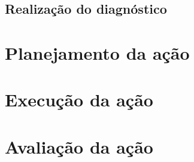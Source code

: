	\subsection{Realização do diagnóstico}



\section{Planejamento da ação}
\section{Execução da ação}
\section{Avaliação da ação}